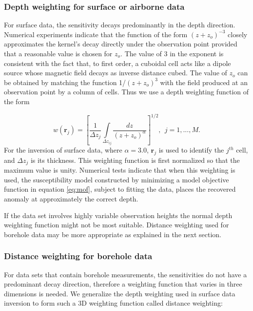 \newcommand{\pvalue}{3} %
\newcommand{\alphavalue}{3.0}
\subsubsection{Depth weighting for surface or airborne data}
\label{Depthw}

For surface data, the sensitivity decays predominantly in the depth direction. Numerical experiments indicate that the function of the form $(z+z_o)^{-\pvalue}$ closely approximates the kernel's decay directly under the observation point provided that a reasonable value is chosen for $z_o$. The value of $\pvalue$ in the exponent is consistent with the fact that, to first order, a cuboidal cell acts like a dipole source whose magnetic field decays as inverse distance cubed. The value of $z_o$ can be obtained by matching the function 1/$(z+z_o)^\pvalue$ with the field produced at an observation point by a column of cells. Thus we use a depth weighting function of the form

\begin{equation}
\label{eq:depthw}
w(\mathbf{r}_j)=\left[\frac{1}{\Delta z_{j}}\int\limits_{\Delta z_{ij}}\frac{dz}{(z+z_o)^\alpha}\right]^{1/2}, ~~ j=1,...,M.
\end{equation}
%
For the inversion of surface data, where $\alpha=\alphavalue$, $\mathbf{r}_j$ is used to identify the $j^{th}$ cell, and $\Delta z_j$ is its thickness. This weighting function is first normalized so that the maximum value is unity. Numerical tests indicate that when this weighting is used, the susceptibility model constructed by minimizing a model objective function in equation \ref{eq:mof}, subject to fitting the data, places the recovered anomaly at approximately the correct depth.

If the data set involves highly variable observation heights the normal depth weighting function might not be most suitable. Distance weighting used for borehole data may be more appropriate as explained in the next section.

\subsubsection{Distance weighting for borehole data}
\label{Distw}

For data sets that contain borehole measurements, the sensitivities do not have a predominant decay direction, therefore a weighting function that varies in three dimensions is needed. We generalize the depth weighting used in surface data inversion to form such a 3D weighting function called distance weighting:

